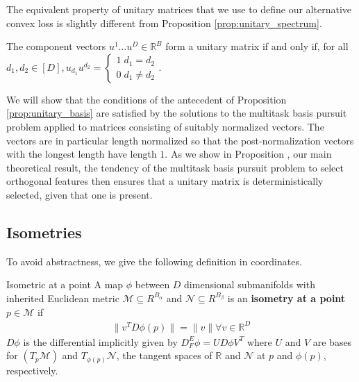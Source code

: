 The equivalent property of unitary matrices that we use to define our alternative convex loss is slightly different from Proposition \ref{prop:unitary_spectrum}.
\begin{proposition}
\label{prop:unitary_basis}
The component vectors $u^1 \dots u^D \in \mathbb R^B$ form a unitary matrix if and only if, for all $d_1, d_2 \in [D], u_{d_1} u^{d_2} = \begin{cases}
1 \; d_1 = d_2\\ 
0 \; d_1 \neq d_2 
\end{cases}$.
\end{proposition}

We will show that the conditions of the antecedent of Proposition \ref{prop:unitary_basis} are satisfied by the solutions to the multitask basis pursuit problem applied to matrices consisting of suitably normalized vectors.
The vectors are in particular length normalized so that the post-normalization vectors with the longest length have length $1$.
As we show in Proposition , our main theoretical result,  the tendency of the multitask basis pursuit problem to select orthogonal features then ensures that a unitary matrix is deterministically selected, given that one is present.


\subsection{Isometries}

To avoid abstractness, we give the following definition in coordinates.

\begin{definition}{Isometric at a point}
A map $\phi$ between $D$ dimensional submanifolds with inherited Euclidean metric $\mathcal M \subseteq R^{B_\alpha}$ and $\mathcal N  \subseteq R^{B_\beta}$ is an \textbf{isometry at a point} $p \in \mathcal M$ if
\begin{align}
\| v^T D \phi (p) \| = \|v\| \forall v \in \mathbb R^D
\end{align}
$D \phi$ is the differential implicitly given by $D_{F}^E \phi = U D \phi V^T$ where $U$ and $V$ are bases for $(T_p \mathcal M)$ and $T_{\phi(p)} \mathcal N$, the tangent spaces of $\mathbb R$ and $\mathcal N$ at $p$ and $\phi(p)$, respectively.
\end{definition}

